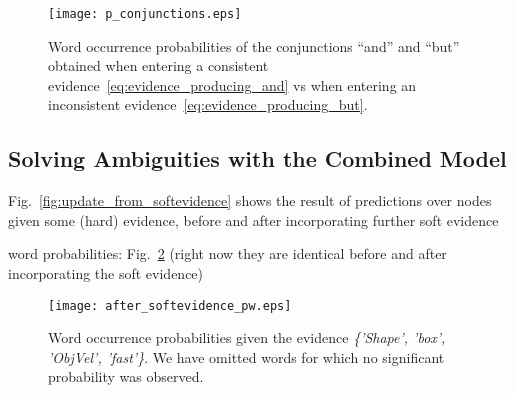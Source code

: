 
\begin{figure}
\centering
\texttt{[image: p\_conjunctions.eps]}
\caption{Word occurrence probabilities of the conjunctions ``and'' and ``but'' obtained when entering a consistent \actioneffect{} evidence~\eqref{eq:evidence_producing_and} vs when entering an inconsistent \actioneffect{} evidence~\eqref{eq:evidence_producing_but}.}
\label{fig:p_conjunctions}
\end{figure}

\subsection{Solving Ambiguities with the Combined Model}

Fig.~\ref{fig:update_from_softevidence} shows the result of predictions over nodes given some (hard) evidence, before and after incorporating further soft evidence

\begin{figure*}
    \centering
     \quad
    \caption{.}
    \label{fig:update_from_softevidence}
\end{figure*}

word probabilities: Fig.~\ref{fig:after_softevidence:pw} (right now they are identical before and after incorporating the soft evidence)

\begin{figure}
\centering
\texttt{[image: after\_softevidence\_pw.eps]}
\caption{Word occurrence probabilities given the evidence \emph{\{'Shape', 'box', 'ObjVel', 'fast'\}}. We have omitted words for which no significant probability was observed.}
\label{fig:after_softevidence:pw}
\end{figure}
